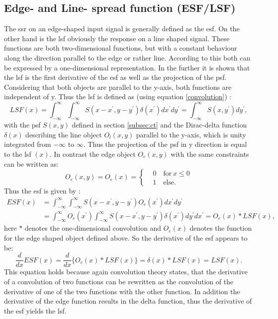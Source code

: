 \subsection{Edge- and Line- spread function (ESF/LSF)} \label{subsec:esflsf}
The \gls{ssr} on an edge-shaped input signal is generally defined as the \gls{esf}. On the other hand is the \gls{lsf} obviously the response on a line shaped signal. These functions are both two-dimensional functions, but with a constant behaviour along the direction parallel to the edge or rather line. According to this both can be expressed by a one-dimensional representation. In the further it is shown that the \gls{lsf} is the first derivative of the \gls{esf} as well as the projection of the \gls{psf}. Considering that both objects are parallel to the y-axis, both functions are independent of y. Thus the \acrlong{lsf} is defined as (using equation \ref{convolution}) \citep{Donath2007}:
\begin{equation}%
LSF(x) = \int_{-\infty}^{\infty} \int_{-\infty}^{\infty} S(x-x^{'},y-y^{'})\delta(x^{'}) dx^{'}dy^{'} =\int_{-\infty}^{\infty} S(x,y^{'}) dy^{'} ,
\end{equation}
with the \acrlong{psf} $S(x,y)$ defined in section \ref{subsec:ct} and the Dirac-delta function $\delta(x)$ describing the line object $O_{l}(x,y)$ parallel to the y-axis, which is unity integrated from  $ -\infty$ to $ \infty $. Thus the projection of the \acrlong{psf} in y direction is equal to the \gls{lsf} $(x)$. In contrast the edge object $O_{e}(x,y)$ with the same constraints can be written as:
\begin{equation}
O_{e}(x,y) = O_{e}(x) = 
\begin{cases}
 & 0 \quad \text{for}\ x\leq 0 \\ & 1 \quad \text{else}.
\end{cases}
\end{equation}
Thus the \gls{esf} is given by \citep{Donath2007}:
\begin{equation}
\begin{aligned}
ESF(x) & = \int_{-\infty}^{\infty} \int_{-\infty}^{\infty} S(x-x^{'},y-y^{'})O_{e}(x^{'}) dx^{'}dy^{'} \\
& = \int_{-\infty}^{\infty}O_{e}(x^{'}) \int_{-\infty}^{\infty} S(x-x^{'},y-y^{'})\delta(x^{'}) dy^{'} dx^{'} =  O_{e}(x) \ast LSF(x),
\end{aligned} 
\end{equation}
here $\ast$ denotes the one-dimensional convolution and $O_{e}(x)$ denotes the function for the edge shaped object defined above. So the derivative of the \gls{esf} appears to be:
\begin{equation}
\frac{d}{dx}ESF(x) = \frac{d}{dx}\lbrace O_{e}(x)\ast LSF(x)\rbrace = \delta(x) \ast LSF(x) = LSF(x).
\end{equation}
This equation holds because again convolution theory states, that the derivative of a convolution of two functions can be rewritten as the convolution of the derivative of one of the two functions with the other function. In addition the derivative of the edge function results in the delta function, thus the derivative of the \gls{esf} yields the \gls{lsf}.\\ 

